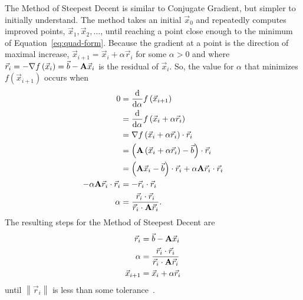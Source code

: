 The Method of Steepest Decent is similar to Conjugate Gradient, but simpler to initially understand.
The method takes an initial \(\vec{x}_0\) and repeatedly computes improved points, \(\vec{x}_1, \vec{x}_2, \dots\), until reaching a point close enough to the minimum of Equation~\ref{eq:quad-form}.
Because the gradient at a point is the direction of maximal increase, \(\vec{x}_{i+1} = \vec{x}_i + \alpha \vec{r}_i\) for some \(\alpha > 0\) and where \(\vec{r}_i = -\nabla f\left(\vec{x}_i\right) = \vec{b} - \mathbf{A}\vec{x}_i\) is the residual of \(\vec{x}_i\).
So, the value for \(\alpha\) that minimizes \(f\left(\vec{x}_{i+1}\right)\) occurs when
\begin{align*}
	0
	&= \frac{\mathrm{d}}{\mathrm{d} \alpha} f\left(\vec{x}_{i+1}\right) \\
	&= \frac{\mathrm{d}}{\mathrm{d} \alpha} f\left(\vec{x}_i + \alpha \vec{r}_i\right) \\
	&= \nabla f\left(\vec{x}_i+\alpha\vec{r}_i\right) \cdot \vec{r}_i \\
	&= \left(\mat{A}\left(\vec{x}_i+\alpha\vec{r}_i\right)-\vec{b}\right)\cdot \vec{r}_i \\
	&= \left(\mat{A}\vec{x}_i-\vec{b}\right)\cdot \vec{r}_i + \alpha\mat{A}\vec{r}_i\cdot \vec{r}_i\\
%
	-\alpha\mat{A}\vec{r}_i\cdot \vec{r}_i
	&= -\vec{r}_i\cdot \vec{r}_i \\
%
	\alpha
	&= \frac{\vec{r}_i\cdot \vec{r}_i}{\vec{r}_i\cdot\mat{A}\vec{r}_i}.
\end{align*}
The resulting steps for the Method of Steepest Decent are
\begin{align*}
	\vec{r}_i &= \vec{b} - \mathbf{A}\vec{x}_i \\
	\alpha &= \frac{\vec{r}_i\cdot \vec{r}_i}{\vec{r}_i\cdot\mathbf{A}\vec{r}_i}\\
	\vec{x}_{i+1} &= \vec{x}_i + \alpha\vec{r}_i
\end{align*}
until \(\left\|\vec{r}_i\right\|\) is less than some tolerance~\cite{Shewchuk:1994:IntroToCG}.


\begin{example}
\end{example}